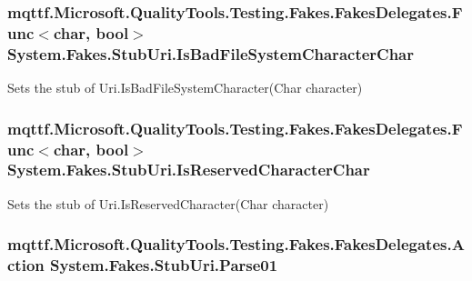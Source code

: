 \hypertarget{class_system_1_1_fakes_1_1_stub_uri_aced03b2ba12cbe85f2be16be1159182d}{
\subsubsection[{Is\-Bad\-File\-System\-Character\-Char}]{\setlength{\rightskip}{0pt plus 5cm}mqttf.\-Microsoft.\-Quality\-Tools.\-Testing.\-Fakes.\-Fakes\-Delegates.\-Func$<$char, bool$>$ System.\-Fakes.\-Stub\-Uri.\-Is\-Bad\-File\-System\-Character\-Char}}\label{class_system_1_1_fakes_1_1_stub_uri_aced03b2ba12cbe85f2be16be1159182d}


Sets the stub of Uri.\-Is\-Bad\-File\-System\-Character(\-Char character)

\hypertarget{class_system_1_1_fakes_1_1_stub_uri_a43379fd66444ef7b257c096b12c2989b}{
\subsubsection[{Is\-Reserved\-Character\-Char}]{\setlength{\rightskip}{0pt plus 5cm}mqttf.\-Microsoft.\-Quality\-Tools.\-Testing.\-Fakes.\-Fakes\-Delegates.\-Func$<$char, bool$>$ System.\-Fakes.\-Stub\-Uri.\-Is\-Reserved\-Character\-Char}}\label{class_system_1_1_fakes_1_1_stub_uri_a43379fd66444ef7b257c096b12c2989b}


Sets the stub of Uri.\-Is\-Reserved\-Character(\-Char character)

\hypertarget{class_system_1_1_fakes_1_1_stub_uri_aa2b48d792bbd2facc7b8325911ecd9e9}{
\subsubsection[{Parse01}]{\setlength{\rightskip}{0pt plus 5cm}mqttf.\-Microsoft.\-Quality\-Tools.\-Testing.\-Fakes.\-Fakes\-Delegates.\-Action System.\-Fakes.\-Stub\-Uri.\-Parse01}}\label{class_system_1_1_fakes_1_1_stub_uri_aa2b48d792bbd2facc7b8325911ecd9e9}


